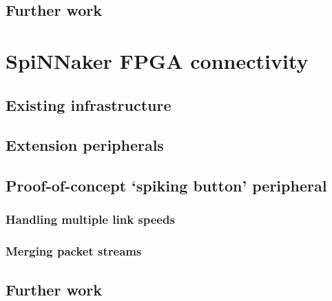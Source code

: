 		\subsection{Further work}
			
	
	
	\section{SpiNNaker FPGA connectivity}
		
			
			\subsection{Existing infrastructure}
				
			
			\subsection{Extension peripherals}
				
			
			\subsection{Proof-of-concept `spiking button' peripheral}
				
				
				\subsubsection{Handling multiple link speeds}
					
				
				\subsubsection{Merging packet streams}
					
			
			\subsection{Further work}
				
	
